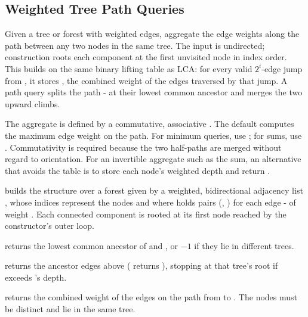 \subsection{Weighted Tree Path Queries}
\label{sec:2.8.7}
Given a tree or forest with weighted edges, aggregate the edge weights along the path between any two nodes in the same tree. The input is undirected; construction roots each component at the first unvisited node in index order. This builds on the same binary lifting table as LCA: for every valid $2^i$-edge jump from , it stores , the combined weight of the edges traversed by that jump. A path query splits the path - at their lowest common ancestor and merges the two upward climbs.

The aggregate is defined by a commutative, associative . The default computes the maximum edge weight on the path. For minimum queries, use ; for sums, use . Commutativity is required because the two half-paths are merged without regard to orientation. For an invertible aggregate such as the sum, an alternative that avoids the  table is to store each node's weighted depth  and return .

\begin{compactitem}
  \item {} builds the structure over a forest given by a weighted, bidirectional adjacency list , whose indices represent the nodes and where  holds pairs (, ) for each edge - of weight . Each connected component is rooted at its first node reached by the constructor's outer loop.
  \item {} returns the lowest common ancestor of  and , or $-1$ if they lie in different trees.
  \item {} returns the ancestor  edges above  ( returns ), stopping at that tree's root if  exceeds 's depth.
  \item {} returns the combined weight of the edges on the path from  to . The nodes must be distinct and lie in the same tree.
\end{compactitem}

